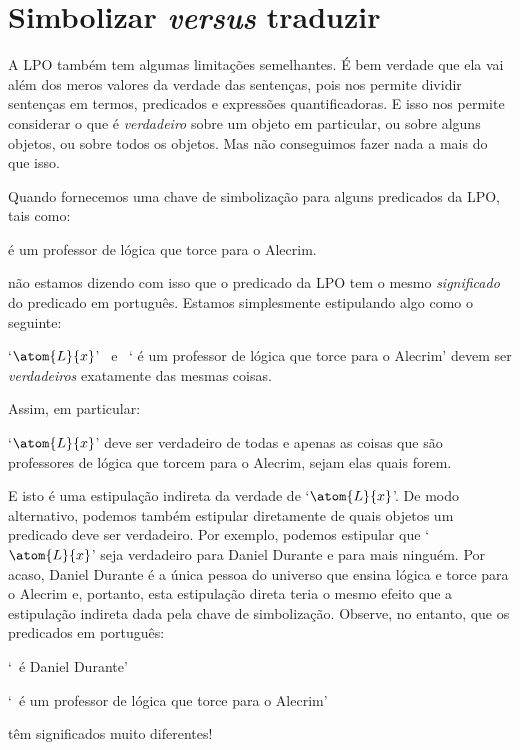 \section{Simbolizar \emph{versus} traduzir}
A LPO também tem algumas limitações semelhantes.
É bem verdade que ela vai além dos meros valores da verdade das sentenças, pois nos permite dividir sentenças em termos, predicados e expressões quantificadoras.
E isso nos permite considerar o que é \emph{verdadeiro} sobre um objeto em particular, ou sobre alguns objetos, ou sobre todos os objetos.
Mas não conseguimos fazer nada a mais do que isso.

Quando fornecemos uma chave de simbolização para alguns predicados da LPO, tais como:
	\begin{ekey}
		\item[\atom{L}{x}]  é um professor de lógica que torce para o Alecrim.
	\end{ekey} 
não estamos dizendo com isso que o predicado da LPO tem o mesmo  \emph{significado} do predicado em português.
Estamos simplesmente estipulando algo como o seguinte:
	\begin{ebullet}
		\item `$\atom{L}{x}$' \ e \ `  é um professor de lógica que torce para o Alecrim' devem ser \emph{verdadeiros} exatamente das mesmas coisas.
	\end{ebullet}
Assim, em particular:
	\begin{ebullet}
		\item `$\atom{L}{x}$' deve ser verdadeiro de todas e apenas as coisas que são professores de lógica que torcem para o Alecrim, sejam elas quais forem.
	\end{ebullet}
E isto é uma estipulação indireta da verdade de `$\atom{L}{x}$'.
De modo alternativo, podemos também estipular diretamente de quais objetos um predicado deve ser verdadeiro.
Por exemplo, podemos estipular que `$\atom{L}{x}$' seja verdadeiro para Daniel Durante e para mais ninguém.
Por acaso, Daniel Durante é a única pessoa do universo que ensina lógica e torce para o Alecrim e, portanto, esta estipulação direta teria o mesmo efeito que a estipulação indireta dada pela chave de simbolização.
Observe, no entanto, que os predicados em português:
\begin{earg}
	\item[] `\blank\ é Daniel Durante'
	\item[] `\blank\ é um professor de lógica que torce para o Alecrim'
\end{earg}
têm significados muito diferentes!

